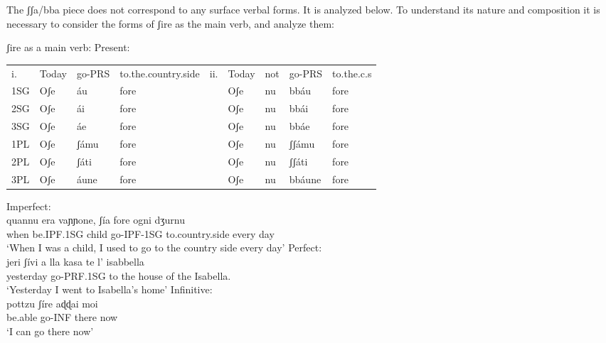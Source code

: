 \documentclass[output=paper,colorlinks,citecolor=brown,
]{langscibook}
\begin{document}
    \z
\z



The ʃʃa/bba piece does not correspond to any surface verbal forms.  It is analyzed below. To understand its nature and composition it is necessary to consider the forms of ʃire as the main verb, and analyze them:

\ea ʃire as a main verb:
    \ea Present:\\
        \begin{table}[htb]
        \begin{tabular}{lllllllll}
        i.  & Today & go-PRS & to.the.country.side & ii. & Today & not & go-PRS & to.the.c.s \\
        1SG & Oʃe   & áu     & fore                &     & Oʃe   & nu  & bbáu   & fore                \\
        2SG & Oʃe   & ái     & fore                &     & Oʃe   & nu  & bbái   & fore                \\
        3SG & Oʃe   & áe     & fore                &     & Oʃe   & nu  & bbáe   & fore                \\
        1PL & Oʃe   & ʃámu   & fore                &     & Oʃe   & nu  & ʃʃámu  & fore                \\
        2PL & Oʃe   & ʃáti   & fore                &     & Oʃe   & nu  & ʃʃáti  & fore                \\
        3PL & Oʃe   & áune   & fore                &     & Oʃe   & nu  & bbáune & fore               
        \end{tabular}
        \end{table}
    \ex Imperfect:\\
    \gll      quannu era    vaɲɲone, ʃía      fore    ogni dʒurnu\\
     when be.IPF.1SG child  go-IPF-1SG to.country.side every day\\
     \glt ‘When I was a child, I used to go to the country side every day’
    \ex  Perfect: \\
    \gll jeri      ʃívi      a lla  kasa   te l’ isabbella\\
     yesterday  go-PRF.1SG to the house of the Isabella.\\
    \glt ‘Yesterday I went to Isabella’s home’
    \ex Infinitive: \\
     \gll pottzu  ʃíre    aɖɖai  moi\\
     be.able go-INF  there now\\
     \glt ‘I can go there now’
    \z
\z
\end{document}
